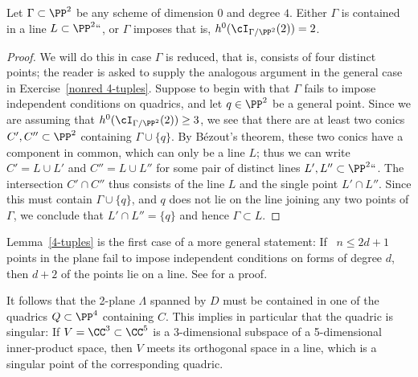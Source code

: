 \begin{lemma}\label{4-tuples}
Let $\Gamma \subset \PP^2$ be any scheme of dimension $0$ and degree
$4$. Either $\Gamma$ is contained in a line $L \subset \PP^2` `$, or
$\Gamma$ imposes
that is,
$h^0(\cI_{\Gamma /\PP^2}(2)) = 2$.
\end{lemma}

\begin{proof}
We will do this in case $\Gamma$ is reduced, that is, consists of four distinct points; the reader is asked to supply the analogous argument in the general case in Exercise~\ref{nonred 4-tuples}. Suppose to begin with that $\Gamma$ fails to impose independent conditions on quadrics, and let $q \in \PP^2$ be a general point. Since we are assuming that $h^0(\cI_{\Gamma /\PP^2}(2)) \geq 3$, we see that there are at least two conics $C', C'' \subset \PP^2$ containing $\Gamma \cup \{q\}$. By B\'ezout's theorem, these two conics have a component in common, which can only be a line $L$; thus we can write $C' = L \cup L'$ and $C'' = L \cup L''$ for some pair of distinct lines $L', L'' \subset \PP^2` `$. The intersection $C' \cap C''$ thus consists of the line $L$ and the single point $L' \cap L''$. Since this must contain $\Gamma \cup \{q\}$, and $q$ does not lie on the line joining any two points of $\Gamma$, we conclude that $L' \cap L'' = \{q\}$ and hence $\Gamma \subset L$.
\end{proof}

\begin{fact}
Lemma~\ref{4-tuples} is the first case of a more general statement: If~
$n\leq 2d+1$ points in the plane fail to impose independent conditions
on forms of degree $d$, then $d+2$ of the points lie on a line. See
\cite[p.~302]{MR1376653} for a proof.
\end{fact}


 It follows that the 2-plane $\Lambda$ spanned by $D$ must be contained in one of the quadrics $Q \subset \PP^4$ containing $C$. This implies in particular that the quadric is singular: If $V = \CC^3\subset \CC^5$
is a  3-dimensional subspace of a 5-dimensional inner-product space, then $V$ meets its orthogonal space
in a line, which is a singular point of the corresponding quadric.

